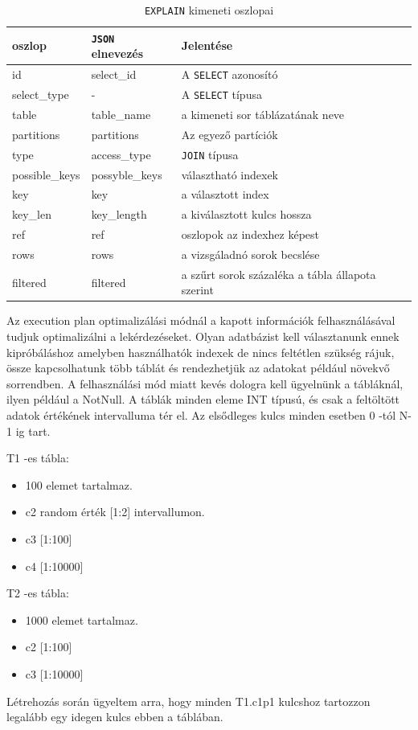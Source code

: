 \begin{table}[h!]
\centering
\caption{\texttt{EXPLAIN} kimeneti oszlopai}
\medskip
\label{tab:cpuvsgpu}
\begin{tabular}{|p{3cm}|p{3cm}|p{8cm}|}
\hline
oszlop & \texttt{JSON} elnevezés & Jelentése \\
\hline
id & select\_id & A \texttt{SELECT} azonosító \\
\hline
select\_type & - & A \texttt{SELECT} típusa \\
\hline
table & table\_name & a kimeneti sor táblázatának neve  \\
\hline
partitions & partitions & Az egyező partíciók \\
\hline
type & access\_type & \texttt{JOIN} típusa  \\
\hline
possible\_keys & possyble\_keys & választható indexek \\
\hline
key & key & a választott index \\
\hline
key\_len & key\_length & a kiválasztott kulcs hossza \\
\hline
ref & ref & oszlopok az indexhez képest \\
\hline
rows & rows & a vizsgáladnó sorok becslése \\
\hline
filtered & filtered & a szűrt sorok százaléka a tábla állapota szerint \\
\hline
\end{tabular}
\end{table}


Az execution plan optimalizálási módnál a kapott információk felhasználásával tudjuk optimalizálni a lekérdezéseket.
Olyan adatbázist kell választanunk ennek kipróbáláshoz amelyben használhatók indexek de nincs feltétlen szükség rájuk, össze kapcsolhatunk több táblát és rendezhetjük az adatokat például növekvő sorrendben. A felhasználási mód miatt kevés dologra kell ügyelnünk a tábláknál, ilyen például a NotNull. A táblák minden eleme INT típusú, és csak a feltöltött adatok értékének intervalluma tér el. Az elsődleges kulcs minden esetben 0 -tól N-1 ig tart.


T1 -es tábla:
\begin{itemize}
\item 100 elemet tartalmaz.
\item c2    random érték [1:2] intervallumon.
\item c3    [1:100]
\item c4    [1:10000]
\end{itemize}
T2 -es tábla:
\begin{itemize}
\item 1000 elemet tartalmaz.
\item c2    [1:100]
\item c3    [1:10000]
\end{itemize}
Létrehozás során ügyeltem arra, hogy minden T1.c1p1 kulcshoz tartozzon legalább egy idegen kulcs ebben a táblában.

